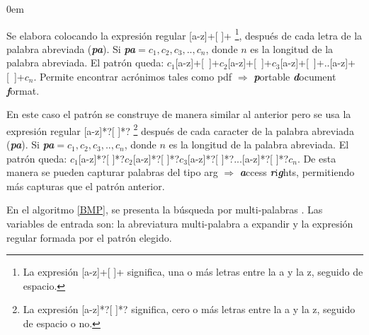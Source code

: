 \begin{description}
\itemsep0em%
\item[Patrón acrónimo:] Se elabora colocando la expresión regular [a-z]+[ ]+ \footnote[1]{La expresión [a-z]+[ ]+ significa, una o más letras entre la a y la z, seguido de espacio.}, después de cada letra de la palabra abreviada (\textit{\textbf{pa}}). Si \textit{\textbf{pa}}$=c_{1},c_{2},c_{3},..,c_{n}$, donde $n$ es la longitud de la palabra abreviada. El patrón queda: \mbox{$c_{1}$[a-z]+[ ]+$c_{2}$[a-z]+[ ]+$c_{3}$[a-z]+[ ]+..[a-z]+[ ]+$c_{n}$}. Permite encontrar acrónimos tales como \textsf{pdf} $\Rightarrow$ \textbf{\textit{p}}ortable \textbf{\textit{d}}ocument \textbf{\textit{f}}ormat.

\item[Patrón de Combinación de Palabras:] En este caso el patrón se construye de manera similar al anterior pero se usa la expresión regular [a-z]*?[ ]*? \footnote[1]{La expresión [a-z]*?[ ]*? significa, cero o más letras entre la a y la z, seguido de espacio o no.} después de cada caracter de la palabra abreviada (\textit{\textbf{pa}}). Si \textit{\textbf{pa}}$=c_{1},c_{2},c_{3},..,c_{n}$, donde $n$ es la longitud de la palabra abreviada. El patrón queda: $c_{1}$[a-z]*?[ ]*?$c_{2}$[a-z]*?[ ]*?$c_{3}$[a-z]*?[ ]*?...[a-z]*?[ ]*?$c_{n}$. De esta manera se pueden capturar palabras del tipo \textsf{arg} $\Rightarrow$ \textbf{\textit{a}}ccess \textbf{\textit{r}}i\textbf{\textit{g}}hts, permitiendo más capturas que el patrón anterior.
\end{description}



En el algoritmo \ref{BMP}, se presenta la búsqueda por multi-palabras \cite{EZH08}. Las variables de entrada son: la abreviatura multi-palabra a expandir y la expresión regular formada por el patrón elegido.

